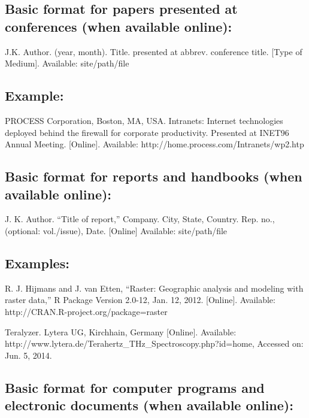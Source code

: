 \subsection*{Basic format for papers presented at conferences (when available online):}

J.K. Author. (year, month). Title. presented at abbrev. conference title. [Type of Medium]. Available: site/path/file

\subsection*{Example:}

\begin{thebibliography}{34}
\setcounter{enumiv}{16}

\bibitem{}PROCESS Corporation, Boston, MA, USA. Intranets: Internet technologies deployed behind the firewall for corporate productivity. Presented at INET96 Annual Meeting. [Online]. Available: http://home.process.com/Intranets/wp2.htp
\end{thebibliography}

\subsection*{Basic format for reports  and  handbooks (when available online):}
  
J. K. Author. ``Title of report,'' Company. City, State, Country. Rep. no., (optional: vol./issue), Date. [Online] Available: site/path/file 

\subsection*{Examples:}

\begin{thebibliography}{34}
\setcounter{enumiv}{17}

\bibitem{}R. J. Hijmans and J. van Etten, ``Raster: Geographic analysis and modeling with raster data,'' R Package Version 2.0-12, Jan. 12, 2012. [Online]. Available: http://CRAN.R-project.org/package=raster 

\bibitem{}Teralyzer. Lytera UG, Kirchhain, Germany [Online]. Available: http://www.lytera.de/Terahertz\_THz\_Spectroscopy.php?id=home, Accessed on: Jun. 5, 2014.
\end{thebibliography}

\subsection*{Basic format for computer programs and electronic documents (when available online):}


